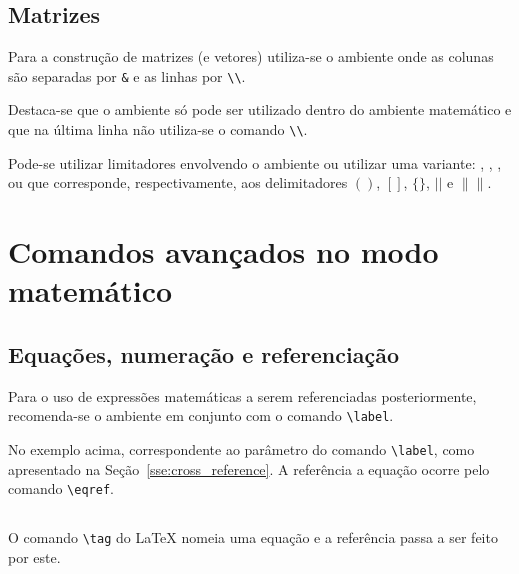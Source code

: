 \subsection{Matrizes}
Para a construção de matrizes (e vetores) utiliza-se o ambiente  onde as colunas são separadas por \lstinline!&! e as linhas por \lstinline!\\!. \\

Destaca-se que o ambiente  só pode ser utilizado dentro do ambiente matemático e que na última linha não utiliza-se o comando \lstinline!\\!.

Pode-se utilizar limitadores envolvendo o ambiente  ou utilizar uma variante: , , ,  ou  que corresponde, respectivamente, aos delimitadores $( )$, $[ ]$, $\{ \}$, $| |$ e $\| \|$. \\

\section{Comandos avan\c{c}ados no modo matem\'{a}tico}
\subsection{Equações, numera\c{c}\~{a}o e referenciação} \label{sse:latex:equation}
Para o uso de expressões matemáticas a serem referenciadas posteriormente, recomenda-se o ambiente  em conjunto com o comando \lstinline!\label!. \\

No exemplo acima,  correspondente ao parâmetro do comando \lstinline!\label!, como apresentado na Seção~\ref{sse:cross_reference}. A referência a equação ocorre pelo comando \lstinline!\eqref!. \\

\subsection{}
O comando \lstinline!\tag! do LaTeX nomeia uma equação e a referência passa a ser feito por este. \\

